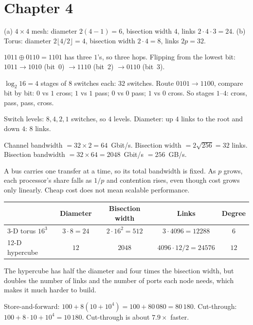 \section*{Chapter 4}
\begin{description}[leftmargin=1.2cm,labelwidth=1cm,itemsep=3pt]
  \item[4.1] (a) $4\times4$ mesh: diameter $2(4-1)=6$, bisection width $4$, links $2\cdot4\cdot3=24$. (b) Torus: diameter $2\lfloor4/2\rfloor=4$, bisection width $2\cdot4=8$, links $2p=32$.
  \item[4.2] $1011\oplus0110=1101$ has three $1$'s, so three hops. Flipping from the lowest bit: $1011\to1010$ (bit~0) $\to1110$ (bit~2) $\to0110$ (bit~3).
  \item[4.3] $\log_2 16=4$ stages of $8$ switches each: $32$ switches. Route $0101\to1100$, compare bit by bit: $0$ vs $1$ cross; $1$ vs $1$ pass; $0$ vs $0$ pass; $1$ vs $0$ cross. So stages $1$--$4$: cross, pass, pass, cross.
  \item[4.4] Switch levels: $8,4,2,1$ switches, so $4$ levels. Diameter: up $4$ links to the root and down $4$: $8$ links.
  \item[4.5] Channel bandwidth $=32\times2=64$~Gbit/s. Bisection width $=2\sqrt{256}=32$ links. Bisection bandwidth $=32\times64=2048$~Gbit/s $=256$~GB/s.
  \item[4.6] A bus carries one transfer at a time, so its total bandwidth is fixed. As $p$ grows, each processor's share falls as $1/p$ and contention rises, even though cost grows only linearly.
        Cheap cost does not mean scalable performance.
  \item[4.7] \begin{center}\small
  \begin{tabular}{@{}lcccc@{}}
  \toprule
   & Diameter & Bisection width & Links & Degree\\
  \midrule
  3-D torus $16^{3}$ & $3\cdot8=24$ & $2\cdot16^{2}=512$ & $3\cdot4096=12288$ & $6$\\
  12-D hypercube & $12$ & $2048$ & $4096\cdot12/2=24576$ & $12$\\
  \bottomrule
  \end{tabular}\end{center}
  The hypercube has half the diameter and four times the bisection width, but doubles the number of links and the number of ports each node needs, which makes it much harder to build.
  \item[4.8] Store-and-forward: $100+8(10+10^{4})=100+80\,080=80\,180$. Cut-through: $100+8\cdot10+10^{4}=10\,180$. Cut-through is about $7.9\times$ faster.
\end{description}

